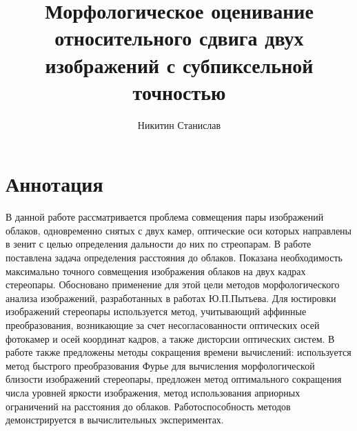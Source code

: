 \documentclass[12pt,a4paper]{article}
\title{Морфологическое оценивание относительного сдвига двух изображений с субпиксельной точностью}
\author{Никитин Станислав}
\affil{ Физический факультет МГУ им. М.В.~Ломоносова\\
Кафедра математического моделирования и информатики }
\date{}
\begin{document}
\maketitle
{}
\section*{Аннотация}
В данной работе рассматривается проблема совмещения пары изображений облаков, одновременно снятых с двух камер, оптические оси которых направлены в зенит с целью определения дальности до них по стреопарам. В работе поставлена задача определения расстояния до облаков. Показана необходимость максимально точного совмещения изображения облаков на двух кадрах стереопары. Обосновано применение для этой цели методов морфологического анализа изображений, разработанных в работах Ю.П.Пытьева. Для юстировки изображений стереопары используется метод, учитывающий аффинные преобразования, возникающие за счет несогласованности оптических осей фотокамер и осей координат кадров, а также дисторсии оптических систем. В работе также предложены методы сокращения времени вычислений: используется метод быстрого преобразования Фурье для вычисления морфологической близости изображений стереопары, предложен метод оптимального сокращения числа уровней яркости изображения, метод использования априорных ограничений на расстояния до облаков. Работоспособность методов демонстрируется в вычислительных экспериментах.
\end{document}
